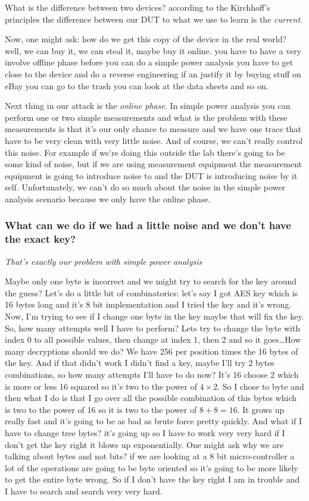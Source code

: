 What is the difference between two devices? according to the Kirchhoff's
principles the difference between our DUT to what we use to learn is the
\textit{current}. 
  
Now, one might ask: how do we get this copy of the device in the real world?
well, we can buy it, we can steal it, maybe buy it online. you have to have a
very involve offline phase before you can do a simple power analysis you have to
get close to the device and do a reverse engineering if an justify it by buying
stuff on eBay you can go to the trash you can look at the data sheets and so on.

Next thing in our attack is the \textit{online phase}. In simple power analysis
you can perform one or two simple measurements and what is the problem with
these measurements  is that it's our only chance to measure and we have one
trace that have to be very clean with very little noise. And of course, we can't
really control this noise. For example if we're doing this outside the lab
there's going to be some kind of noise, but if we are using measurement
equipment the measurement equipment is going to introduce noise to and the DUT
is introducing noise by it self. Unfortunately, we can't do so much about the
noise in the simple power analysis scenario because we only have the online
phase.

\subsubsection{What can we do if we had a little noise and we don't have the exact key?}

\textit{That's exactly our problem with simple power analysis}

Maybe only one byte is incorrect and we might try to search for the key around
the guess? Let's do a little bit of combinatorics: let's say I got AES key which
is 16 bytes long and it's 8 bit implementation and I tried the key and it's
wrong. Now, I'm trying to see if I change one byte in the key maybe that will
fix the key. So, how many attempts well I have to perform? Lets try to change
the byte with index 0 to all possible values, then change at index 1, then 2 and
so it goes\ldots How many decryptions should we do? We have 256 per position
times the 16 bytes of the key. And if that didn't work I didn't find a key,
maybe I'll try 2 bytes combinations, so how many attempts I'll have to do now?
It's 16 choose 2 which is more or less 16 squared so it's two to the power of
$4\times2$. So I chose to byte and then what I do is that I go over all the
possible combination of this bytes which is two to the power of 16 so it is two
to the power of $8+8=16$. It grows up really fast and it's going to be as bad as
brute force pretty quickly. And what if I have to change tree bytes? it's going
up so I have to work very very hard if I don't get the key right it blows up
exponentially. One might ask why we are talking about bytes and not bits? if we
are looking at a 8 bit micro-controller a lot of the operations are going to be
byte oriented so it's going to be more likely to get the entire byte wrong. So
if I don't have the key right I am in trouble and I have to search and search
very very hard. 

